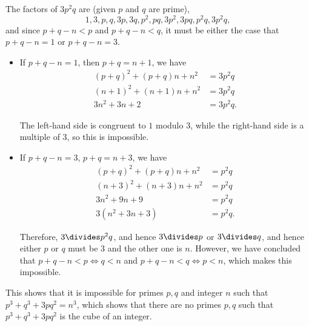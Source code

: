 \begin{enumerate}
          The factors of \(3p^2 q\) are (given \(p\) and \(q\) are prime),
          \[
              1, 3, p, q, 3p, 3q, p^2, pq, 3p^2, 3pq, p^2 q, 3 p^2 q,
          \]
          and since \(p + q - n < p\) and \(p + q - n < q\), it must be either the case that \(p + q - n = 1\) or \(p + q - n = 3\).

          \begin{itemize}
              \item If \(p + q - n = 1\), then \(p + q = n + 1\), we have
                    \begin{align*}
                        (p + q)^2 + (p + q) n + n^2 & = 3 p^2 q  \\
                        (n + 1)^2 + (n + 1) n + n^2 & = 3 p^2 q  \\
                        3n^2 + 3n + 2               & = 3 p^2 q.
                    \end{align*}

                    The left-hand side is congruent to \(1\) modulo \(3\), while the right-hand side is a multiple of \(3\), so this is impossible.

              \item If \(p + q - n = 3\), \(p + q = n + 3\), we have
                    \begin{align*}
                        (p + q)^2 + (p + q) n + n^2 & = p^2 q  \\
                        (n + 3)^2 + (n + 3)n + n^2  & = p^2 q  \\
                        3n^2 + 9n + 9               & = p^2 q  \\
                        3 (n^2 + 3n + 3)            & = p^2 q.
                    \end{align*}

                    Therefore, \(3 \divides p^2 q\), and hence \(3 \divides p\) or \(3 \divides q\), and hence either \(p\) or \(q\) must be \(3\) and the other one is \(n\). However, we have concluded that \(p + q - n < p \iff q < n\) and \(p + q - n < q \iff p < n\), which makes this impossible.
          \end{itemize}

          This shows that it is impossible for primes \(p, q\) and integer \(n\) such that \(p^3 + q^3 + 3pq^2 = n^3\), which shows that there are no primes \(p, q\) such that \(p^3 + q^3 + 3pq^2\) is the cube of an integer.
\end{enumerate}